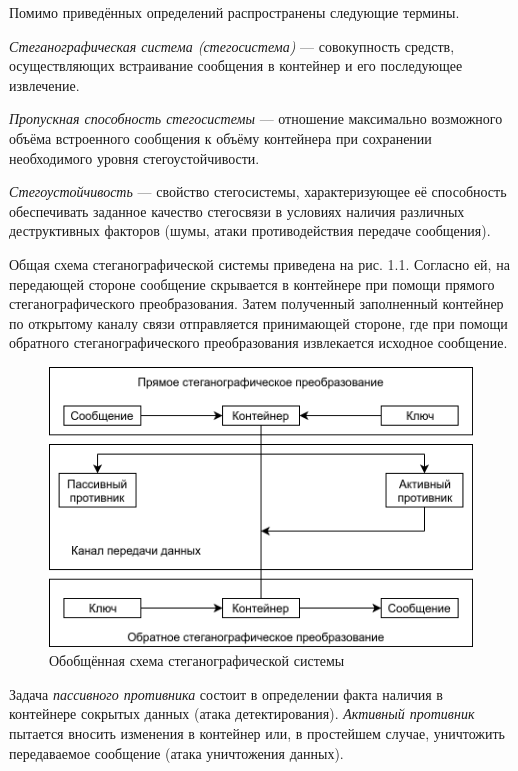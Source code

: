 Помимо приведённых определений распространены следующие термины.

\textit{Стеганографическая система (стегосистема)} --- совокупность средств, осуществляющих встраивание сообщения в контейнер и его последующее извлечение.

\textit{Пропускная способность стегосистемы} --- отношение максимально возможного объёма встроенного сообщения к объёму контейнера при сохранении необходимого уровня стегоустойчивости.

\textit{Стегоустойчивость} --- свойство стегосистемы, характеризующее её способность обеспечивать заданное качество стегосвязи в условиях наличия различных деструктивных факторов (шумы, атаки противодействия передаче сообщения).

Общая схема стеганографической системы приведена на рис. 1.1. Согласно ей, на передающей стороне сообщение скрывается в контейнере при помощи прямого стеганографического преобразования. Затем полученный заполненный контейнер по открытому каналу связи отправляется принимающей стороне, где при помощи обратного стеганографического преобразования извлекается исходное сообщение.

\begin{figure}
\centering
\includegraphics[width=1\textwidth]{include/graphics/im_1-stego_system}
\caption{Обобщённая схема стеганографической системы}
\label{fig:StegoSystem}
\end{figure}

Задача \textit{пассивного противника} состоит в определении факта наличия в контейнере сокрытых данных (атака детектирования). \textit{Активный противник} пытается вносить изменения в контейнер или, в простейшем случае, уничтожить передаваемое сообщение (атака уничтожения данных).


